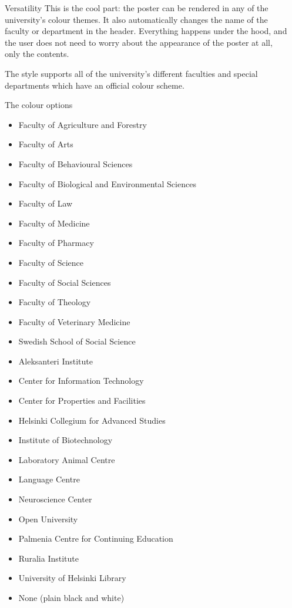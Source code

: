 \documentclass[final]{beamer}
\begin{document}
\begin{frame}[t, fragile]
\begin{columns}[T]
\begin{column}{0.32\linewidth}
\end{column}

\begin{column}{0.32\linewidth}

\begin{block}{Versatility}
This is the cool part: the poster can be rendered in any of the university's colour themes. It also automatically changes the name of the faculty or department in the header. Everything happens under the hood, and the user does not need to worry about the appearance of the poster at all, only the contents.

The style supports all of the university's different faculties and special departments which have an official colour scheme.
\end{block}

\begin{block}{The colour options}
\begin{itemize}
\item Faculty of Agriculture and Forestry 
\item Faculty of Arts 
\item Faculty of Behavioural Sciences 
\item Faculty of Biological and Environmental Sciences 
\item Faculty of Law 
\item Faculty of Medicine 
\item Faculty of Pharmacy 
\item Faculty of Science 
\item Faculty of Social Sciences 
\item Faculty of Theology 
\item Faculty of Veterinary Medicine 
\item Swedish School of Social Science
\item Aleksanteri Institute
\item Center for Information Technology
\item Center for Properties and Facilities
\item Helsinki Collegium for Advanced Studies
\item Institute of Biotechnology
\item Laboratory Animal Centre
\item Language Centre
\item Neuroscience Center
\item Open University
\item Palmenia Centre for Continuing Education
\item Ruralia Institute
\item University of Helsinki Library
\item None (plain black and white)
\end{itemize}
\end{block}


\end{column}
\end{columns}
\end{frame}
\end{document}
